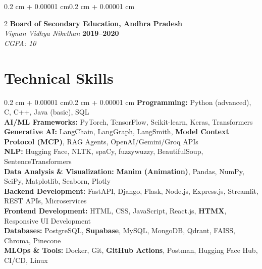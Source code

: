 \documentclass[10pt, letterpaper]{article}
\newenvironment{onecolentry}{\begin{adjustwidth}{0.2 cm + 0.00001 cm}{0.2 cm + 0.00001 cm}}{\end{adjustwidth}}
\newenvironment{twocolentry}[2][]{\onecolentry\def\secondColumn{#2}\setcolumnwidth{\fill, 4.5 cm}\begin{paracol}{2}}{\switchcolumn \raggedleft \secondColumn\end{paracol}\endonecolentry}
\begin{document}
\vspace{0.10 cm}
\begin{twocolentry}{\textbf{2019--2020} \\ \textit{CGPA: 10}}
    \textbf{Board of Secondary Education, Andhra Pradesh} \\
    \textit{Vignan Vidhya Nikethan}
\end{twocolentry}







\section{Technical Skills}

\begin{onecolentry}
    \textbf{Programming:} Python (advanced), C, C++, Java (basic), SQL \\[2pt]
    \textbf{AI/ML Frameworks:} PyTorch, TensorFlow, Scikit-learn, Keras, Transformers \\[2pt]
    \textbf{Generative AI:} LangChain, LangGraph, LangSmith, \textbf{Model Context Protocol (MCP)}, RAG Agents, OpenAI/Gemini/Groq APIs \\[2pt]
    \textbf{NLP:} Hugging Face, NLTK, spaCy, fuzzywuzzy, BeautifulSoup, SentenceTransformers \\[2pt]
    \textbf{Data Analysis \& Visualization:} \textbf{Manim (Animation)}, Pandas, NumPy, SciPy, Matplotlib, Seaborn, Plotly \\[2pt]
    \textbf{Backend Development:} FastAPI, Django, Flask, Node.js, Express.js, Streamlit, REST APIs, Microservices \\[2pt]
    \textbf{Frontend Development:} HTML, CSS, JavaScript, React.js, \textbf{HTMX}, Responsive UI Development \\[2pt]
    \textbf{Databases:} PostgreSQL, \textbf{Supabase}, MySQL, MongoDB, Qdrant, FAISS, Chroma, Pinecone \\[2pt]
    \textbf{MLOps \& Tools:} Docker, Git, \textbf{GitHub Actions}, Postman, Hugging Face Hub, CI/CD, Linux \\
\end{onecolentry}
\end{document}
